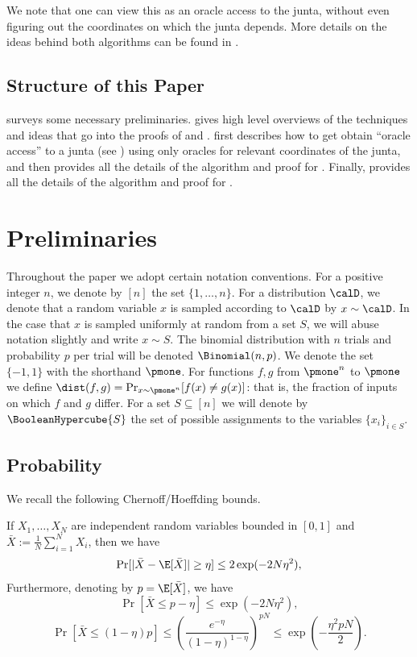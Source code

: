%

We note that one can view this as an oracle access to the junta, without even figuring out the coordinates on which the junta depends. 
 More details on the ideas behind both algorithms can be found in .


 
\subsection{Structure of this Paper}
 surveys some necessary preliminaries.  gives high level overviews of the techniques and ideas that go into the proofs of  and . 
  first describes how to get obtain ``oracle access'' to a junta (see ) using only oracles for relevant coordinates of the junta, and then provides all the details of the algorithm and proof for . Finally,  provides all the details of the algorithm and proof for . 


%
%
%
%
\section{Preliminaries}
\label{section:preliminaries}

Throughout the paper we adopt certain notation conventions. For a positive integer $n$, we denote by $[n]$ the set $\{1,\ldots,n\}$. For a distribution $\calD$, we denote that a random variable $x$ is sampled according to $\calD$ by $x \sim \calD$. In the case that $x$ is sampled uniformly at random from a set $S$, we will abuse notation slightly and write $x \sim S$. 
The binomial distribution with $n$ trials and probability $p$ per trial will be denoted $\Binomial(n,p)$. We denote the set $\{-1,1\}$ with the shorthand $\pmone$. For functions $f,g$ from $\pmone^n$ to $\pmone$ we define $\dist(f,g) = \Pr_{x\sim \pmone^n}[f(x) \neq g(x)]$: that is, the fraction of inputs on which $f$ and $g$ differ. For a set $S \subseteq [n]$ we will denote by $\BooleanHypercube{S}$ the set of possible assignments to the variables $\{x_i\}_{i \in S}$.

\subsection{Probability}
We recall the following Chernoff/Hoeffding bounds.
\begin{fact}
\label{fact:chernoff}
If $X_1,\ldots,X_N$ are independent random variables bounded in $[0,1]$ and $\bar{X} := \frac{1}{N} \sum_{i=1}^N X_i$, then we have
$$\Pr[|\bar{X} - \E[\bar{X}]| \geq \eta] \leq 2 \exp(-2N\eta^2),$$
Furthermore,  denoting by $p = \E[\bar{X}]$, we have 
$$\Pr[\bar{X} \leq p-\eta] \leq  \exp(-2N\eta^2),$$
$$
\Pr[\bar{X} \leq (1-\eta)p] \leq \left (\frac{e^{-\eta}}{(1-\eta)^{1-\eta}}\right)^{pN}\leq \exp\!\left(-\dfrac{\eta^2pN}{2}\right).
$$
\end{fact}







